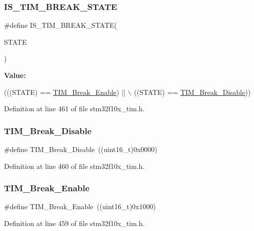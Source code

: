 \subsubsection{\texorpdfstring{I\+S\+\_\+\+T\+I\+M\+\_\+\+B\+R\+E\+A\+K\+\_\+\+S\+T\+A\+TE}{IS\_TIM\_BREAK\_STATE}}
{\footnotesize\ttfamily \#define I\+S\+\_\+\+T\+I\+M\+\_\+\+B\+R\+E\+A\+K\+\_\+\+S\+T\+A\+TE(\begin{DoxyParamCaption}\item[{}]{S\+T\+A\+TE }\end{DoxyParamCaption})}

{\bfseries Value\+:}
\begin{DoxyCode}
(((STATE) == \hyperlink{group___break___input__enable__disable_gae7fbc11ac043454b2a880bffe98fdb8c}{TIM\_Break\_Enable}) || \(\backslash\)
                                   ((STATE) == \hyperlink{group___break___input__enable__disable_ga31ba16dd70ad4d99adc911f7bf6662e5}{TIM\_Break\_Disable}))
\end{DoxyCode}


Definition at line 461 of file stm32f10x\+\_\+tim.\+h.

\mbox{\label{group___break___input__enable__disable_ga31ba16dd70ad4d99adc911f7bf6662e5}} 
\subsubsection{\texorpdfstring{T\+I\+M\+\_\+\+Break\+\_\+\+Disable}{TIM\_Break\_Disable}}
{\footnotesize\ttfamily \#define T\+I\+M\+\_\+\+Break\+\_\+\+Disable~((uint16\+\_\+t)0x0000)}



Definition at line 460 of file stm32f10x\+\_\+tim.\+h.

\mbox{\label{group___break___input__enable__disable_gae7fbc11ac043454b2a880bffe98fdb8c}} 
\subsubsection{\texorpdfstring{T\+I\+M\+\_\+\+Break\+\_\+\+Enable}{TIM\_Break\_Enable}}
{\footnotesize\ttfamily \#define T\+I\+M\+\_\+\+Break\+\_\+\+Enable~((uint16\+\_\+t)0x1000)}



Definition at line 459 of file stm32f10x\+\_\+tim.\+h.

